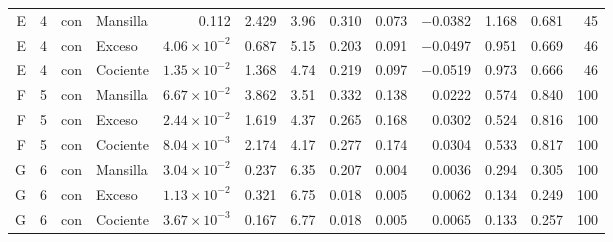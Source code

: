 \documentclass[11pt,letterpaper]{article}
\begin{document}
\begin{table}[H]
\begin{adjustbox}{max width=\textwidth}
\begin{tabular}{rrllrrrrrrrrr}
E & 4 & con & Mansilla & 0.112 & 2.429 & 3.96 & 0.310 & 0.073 & $-$0.0382 & 1.168 & 0.681 & 45 \\
E & 4 & con & Exceso & $4.06\times10^{-2}$ & 0.687 & 5.15 & 0.203 & 0.091 & $-$0.0497 & 0.951 & 0.669 & 46 \\
E & 4 & con & Cociente & $1.35\times10^{-2}$ & 1.368 & 4.74 & 0.219 & 0.097 & $-$0.0519 & 0.973 & 0.666 & 46 \\
F & 5 & con & Mansilla & $6.67\times10^{-2}$ & 3.862 & 3.51 & 0.332 & 0.138 & 0.0222 & 0.574 & 0.840 & 100 \\
F & 5 & con & Exceso & $2.44\times10^{-2}$ & 1.619 & 4.37 & 0.265 & 0.168 & 0.0302 & 0.524 & 0.816 & 100 \\
F & 5 & con & Cociente & $8.04\times10^{-3}$ & 2.174 & 4.17 & 0.277 & 0.174 & 0.0304 & 0.533 & 0.817 & 100 \\
G & 6 & con & Mansilla & $3.04\times10^{-2}$ & 0.237 & 6.35 & 0.207 & 0.004 & 0.0036 & 0.294 & 0.305 & 100 \\
G & 6 & con & Exceso & $1.13\times10^{-2}$ & 0.321 & 6.75 & 0.018 & 0.005 & 0.0062 & 0.134 & 0.249 & 100 \\
G & 6 & con & Cociente & $3.67\times10^{-3}$ & 0.167 & 6.77 & 0.018 & 0.005 & 0.0065 & 0.133 & 0.257 & 100 \\
\bottomrule
\end{tabular}
\end{adjustbox}
\end{table}
\end{document}
